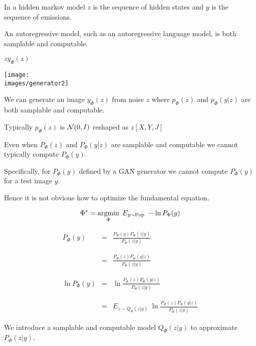{\vfill
In a hidden markov model $z$ is the sequence of hidden states and $y$ is the sequence of emissions.

\vfill
An autoregressive model, such as an autoregressive language model, is both samplable and computable.


\centerline{$z$\hspace{5in}$y_\Phi(z)$}
\centerline{\texttt{[image: \\images/generator2]}}


\vfill
We can generate an image $y_\Phi(z)$ from noise $z$ where $p_\Phi(z)$ and $p_\Phi(y|z)$ are both samplable and computable.

\vfill
Typically $p_\Phi(z)$ is ${\cal N}(0,I)$ reshaped as $z[X,Y,J]$



\bigskip
\bigskip
Even when $P_\Phi(z)$ and $P_\Phi(y|z)$ are samplable and computable we cannot typically compute $P_\Phi(y)$.

\vfill
Specifically, for $P_\Phi(y)$ defined by a GAN generator we cannot compute $P_\Phi(y)$ for a test image $y$.

\vfill
Hence it is not obvious how to optimize the fundamental equation.

$$\Phi^* = \operatorname*{argmin}_\Phi\;E_{y \sim \mathrm{Pop}}\;- \ln P_\Phi(y)$$


{\huge
\begin{eqnarray*}
P_\Phi(y) & = & \frac{P_\Phi(y)P_\Phi(z|y)}{P_\Phi(z|y)} \\
\\
\\
& = & \frac{P_\Phi(z) P_\Phi(y|z)}{P_\Phi(z|y)} \\
\\
\\
\ln P_\Phi(y) & = & \ln \frac{P_\Phi(z) P_\Phi(y|z)}{P_\Phi(z|y)} \\
\\
\\
& = & E_{z \sim Q_\Phi(z|y)}\;\ln \frac{P_\Phi(z) P_\Phi(y|z)}{P_\Phi(z|y)}
\end{eqnarray*}
}


We introduce a samplable and computable model $Q_\Phi(z|y)$ to approximate $P_\Phi(z|y)$.

}
